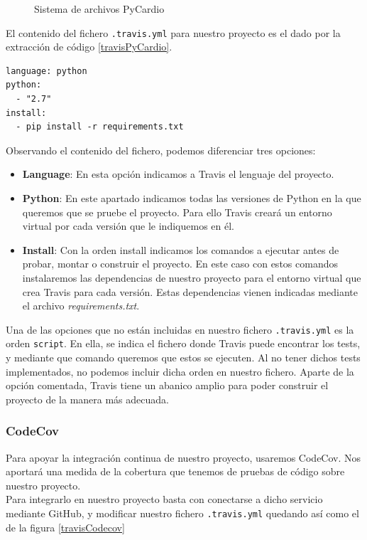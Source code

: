 \begin{figure}[h]
\centering
{}
\caption{Sistema de archivos PyCardio}
\label{fig:travisDir}
\end{figure}
El contenido del fichero \texttt{.travis.yml} para nuestro proyecto es el dado por la extracción de código \ref{travisPyCardio}. 
\begin{lstlisting}[caption={\texttt{.travis.yml} de PyCardio},label=travisPyCardio]
language: python
python:
  - "2.7"
install:
  - pip install -r requirements.txt
\end{lstlisting}
Observando el contenido del fichero, podemos diferenciar tres opciones:
\begin{itemize}
    \item \textbf{Language}: En esta opción indicamos a Travis el lenguaje del proyecto.
    \item \textbf{Python}: En este apartado indicamos todas las versiones de Python en la que queremos que se pruebe el proyecto. Para ello Travis creará un entorno virtual por cada versión que le indiquemos en él.
    \item \textbf{Install}: Con la orden install indicamos los comandos a ejecutar antes de probar, montar o construir el proyecto. En este caso con estos comandos instalaremos las dependencias de nuestro proyecto para el entorno virtual que crea Travis para cada versión. Estas dependencias vienen indicadas mediante el archivo \textit{requirements.txt}. 
\end{itemize}
Una de las opciones que no están incluidas en nuestro fichero \texttt{.travis.yml} es la orden \texttt{script}. En ella, se indica el fichero donde Travis puede encontrar los tests, y mediante que comando queremos que estos se ejecuten. Al no tener dichos tests implementados, no podemos incluir dicha orden en nuestro fichero. Aparte de la opción comentada, Travis tiene un abanico amplio para poder construir el proyecto de la manera más adecuada.

\subsubsection*{CodeCov}
\label{subsubsec:CodeCov}
Para apoyar la integración continua de nuestro proyecto, usaremos CodeCov. Nos aportará una medida de la cobertura que tenemos de pruebas de código sobre nuestro proyecto. \\
Para integrarlo en nuestro proyecto basta con conectarse a dicho servicio mediante GitHub, y modificar nuestro fichero \texttt{.travis.yml} quedando así como el de la figura \ref{travisCodecov}

